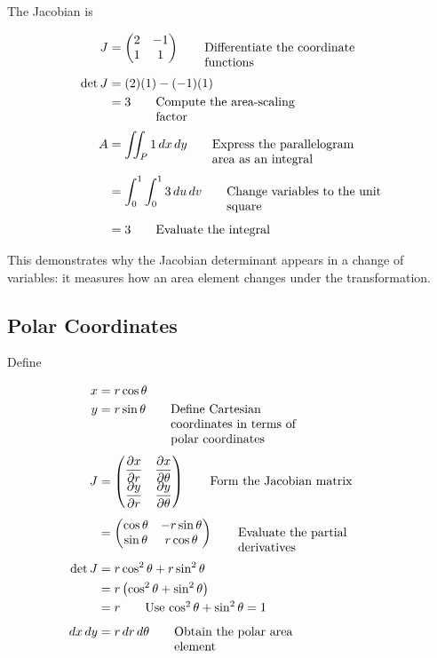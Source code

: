 \documentclass{article}
\newcommand{\justwidth}{0.36\textwidth}
\newcommand{\just}[1]{\parbox[t]{\justwidth}{\raggedright #1}}
\newlength{\defaultparwidth}
\newcommand{\defaultwidthpar}[1]{%
  \par
  \noindent\hfill
  \begin{minipage}{\defaultparwidth}%
  #1%
  \end{minipage}%
  \hfill\null
  \par
}
\begin{document}
\defaultwidthpar{The Jacobian is}

\begin{align*}
J
&=
\begin{pmatrix}
2 & -1\\
1 & 1
\end{pmatrix}
\tag*{\just{Differentiate the coordinate functions}}
\\[0.45em]
\det J
&=
(2)(1)-(-1)(1)
\\
&=
3
\tag*{\just{Compute the area-scaling factor}}
\\[0.45em]
A
&=
\iint_P
1\,dx\,dy
\tag*{\just{Express the parallelogram area as an integral}}
\\[0.45em]
&=
\int_0^1
\int_0^1
3\,du\,dv
\tag*{\just{Change variables to the unit square}}
\\[0.45em]
&=
3
\tag*{\just{Evaluate the integral}}
\end{align*}

\defaultwidthpar{This demonstrates why the Jacobian determinant appears in a change of variables: it measures how an area element changes under the transformation.}

\subsection{Polar Coordinates}
Define

\begin{align*}
x
&=
r\cos\theta
\\
y
&=
r\sin\theta
\tag*{\just{Define Cartesian coordinates in terms of polar coordinates}}
\\[0.45em]
J
&=
\begin{pmatrix}
\dfrac{\partial x}{\partial r}
&
\dfrac{\partial x}{\partial\theta}
\\
\dfrac{\partial y}{\partial r}
&
\dfrac{\partial y}{\partial\theta}
\end{pmatrix}
\tag*{\just{Form the Jacobian matrix}}
\\[0.45em]
&=
\begin{pmatrix}
\cos\theta
&
-r\sin\theta
\\
\sin\theta
&
r\cos\theta
\end{pmatrix}
\tag*{\just{Evaluate the partial derivatives}}
\\[0.45em]
\det J
&=
r\cos^2\theta
+
r\sin^2\theta
\\
&=
r
\left(
\cos^2\theta+\sin^2\theta
\right)
\\
&=
r
\tag*{\just{Use $\cos^2\theta+\sin^2\theta=1$}}
\\[0.45em]
dx\,dy
&=
r\,dr\,d\theta
\tag*{\just{Obtain the polar area element}}
\end{align*}
\end{document}
